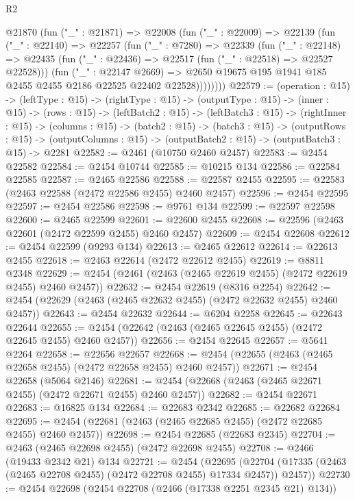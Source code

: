 \begin{lexlean}{R2}
\begin{coremodule}
        @21870
          (fun ("_" : @21871) =>
          @22008
            (fun ("_" : @22009) =>
            @22139
              (fun ("_" : @22140) =>
              @22257
                (fun ("_" : @7280) =>
                @22339
                  (fun ("_" : @22148) =>
                  @22435 (fun ("_" : @22436) => @22517 (fun ("_" : @22518) => @22527 @22528)))
                  (fun ("_" : @22147 @2669) =>
                  @2650 @19675 @195 @1941 @185 @2455 @2455 @2186 @22525 @22402 @22528))))))))
@22579 := (operation : @15) ->
  (leftType : @15) ->
  (rightType : @15) ->
  (outputType : @15) ->
  (inner : @15) ->
  (rows : @15) ->
  (leftBatch2 : @15) ->
  (leftBatch3 : @15) ->
  (rightInner : @15) ->
  (columns : @15) ->
  (batch2 : @15) ->
  (batch3 : @15) ->
  (outputRows : @15) ->
  (outputColumns : @15) -> (outputBatch2 : @15) -> (outputBatch3 : @15) -> @2281
@22582 := @2461 (@10750 @2460 @2457)
@22583 := @2454 @22582
@22584 := @2454 @10744
@22585 := @10215 @134
@22586 := @22584 @22585
@22587 := @2465 @22586
@22588 := @22587 @2455
@22595 := @22583 (@2463 @22588 (@2472 @22586 @2455) @2460 @2457)
@22596 := @2454 @22595
@22597 := @2454 @22586
@22598 := @9761 @134
@22599 := @22597 @22598
@22600 := @2465 @22599
@22601 := @22600 @2455
@22608 := @22596 (@2463 @22601 (@2472 @22599 @2455) @2460 @2457)
@22609 := @2454 @22608
@22612 := @2454 @22599 (@9293 @134)
@22613 := @2465 @22612
@22614 := @22613 @2455
@22618 := @2463 @22614 (@2472 @22612 @2455)
@22619 := @8811 @2348
@22629 := @2454 (@2461 (@2463 (@2465 @22619 @2455) (@2472 @22619 @2455) @2460 @2457))
@22632 := @2454 @22619 (@8316 @2254)
@22642 := @2454 (@22629 (@2463 (@2465 @22632 @2455) (@2472 @22632 @2455) @2460 @2457))
@22643 := @2454 @22632
@22644 := @6204 @2258
@22645 := @22643 @22644
@22655 := @2454 (@22642 (@2463 (@2465 @22645 @2455) (@2472 @22645 @2455) @2460 @2457))
@22656 := @2454 @22645
@22657 := @5641 @2264
@22658 := @22656 @22657
@22668 := @2454 (@22655 (@2463 (@2465 @22658 @2455) (@2472 @22658 @2455) @2460 @2457))
@22671 := @2454 @22658 (@5064 @2146)
@22681 := @2454 (@22668 (@2463 (@2465 @22671 @2455) (@2472 @22671 @2455) @2460 @2457))
@22682 := @2454 @22671
@22683 := @16825 @134
@22684 := @22683 @2342
@22685 := @22682 @22684
@22695 := @2454 (@22681 (@2463 (@2465 @22685 @2455) (@2472 @22685 @2455) @2460 @2457))
@22698 := @2454 @22685 (@22683 @2345)
@22704 := @2463 (@2465 @22698 @2455) (@2472 @22698 @2455)
@22708 := @2466 (@19433 @2342 @21) @134
@22721 := @2454
    (@22695 (@22704 (@17335 (@2463 (@2465 @22708 @2455) (@2472 @22708 @2455) @17334 @2457)) @2457))
@22730 := @2454 @22698 (@2454 @22708 (@2466 (@17338 @2251 @2345 @21) @134))

\end{coremodule}
\end{lexlean}
